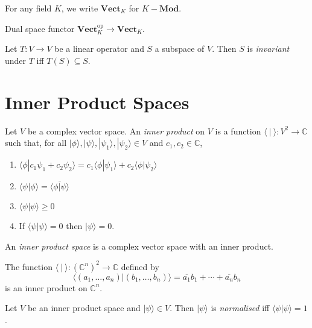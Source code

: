 \begin{df}
For any field $K$, we write $\mathbf{Vect}_K$ for $K-\mathbf{Mod}$.
\end{df}

Dual space functor $\mathbf{Vect}_K^{\mathrm{op}} \rightarrow \mathbf{Vect}_K$.

\begin{df}[Invariant]
Let $T : V \rightarrow V$ be a linear operator and $S$ a subspace of $V$. Then $S$ is \emph{invariant} under $T$ iff $T(S) \subseteq S$.
\end{df}

\section{Inner Product Spaces}

\begin{df}
Let $V$ be a complex vector space. An \emph{inner product} on $V$ is a function $\langle \ | \ \rangle : V^2 \rightarrow \mathbb{C}$ such that, for all $|\phi\rangle, |\psi\rangle, |\psi_1 \rangle, | \psi_2 \rangle \in V$ and $c_1, c_2 \in \mathbb{C}$,
\begin{enumerate}
\item $\langle \phi | c_1 \psi_1 + c_2 \psi_2 \rangle = c_1 \langle \phi | \psi_1 \rangle + c_2 \langle \phi | \psi_2 \rangle$
\item $\langle \psi | \phi \rangle = \overline{\langle \phi | \psi \rangle}$
\item $\langle \psi | \psi \rangle \geq 0$
\item If $\langle \psi | \psi \rangle = 0$ then $|\psi\rangle = 0$.
\end{enumerate}

An \emph{inner product space} is a complex vector space with an inner product.
\end{df}

\begin{ex}
The function $\langle \ | \ \rangle : (\mathbb{C}^n)^2 \rightarrow \mathbb{C}$ defined by
\[ \langle (a_1, \ldots, a_n) | (b_1, \ldots, b_n) \rangle = \overline{a_1} b_1 + \cdots + \overline{a_n} b_n \]
is an inner product on $\mathbb{C}^n$.
\end{ex}

\begin{df}[Normalised]
Let $V$ be an inner product space and $|\psi\rangle \in V$. Then $|\psi\rangle$ is \emph{normalised} iff $\langle \psi | \psi \rangle = 1$.
\end{df} 

